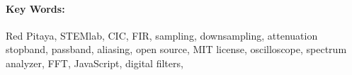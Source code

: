 %
%

\vfill

\paragraph{Key Words:} Red Pitaya, STEMlab,  CIC, FIR, sampling, downsampling,
attenuation   stopband,  passband,   aliasing,  open   source,  MIT   license,
oscilloscope, spectrum analyzer, FFT, JavaScript, digital filters,
